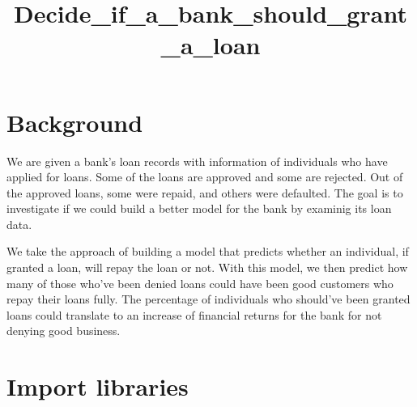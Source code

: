 \documentclass{report}
\title{Decide\_if\_a\_bank\_should\_grant\_a\_loan}
\begin{document}
    
    
    
    \maketitle
    
    
    \tableofcontents


    
\chapter{Background}\label{background}

We are given a bank's loan records with information of individuals who
have applied for loans. Some of the loans are approved and some are
rejected. Out of the approved loans, some were repaid, and others were
defaulted. The goal is to investigate if we could build a better model
for the bank by examinig its loan data.

We take the approach of building a model that predicts whether an
individual, if granted a loan, will repay the loan or not. With this
model, we then predict how many of those who've been denied loans could
have been good customers who repay their loans fully. The percentage of
individuals who should've been granted loans could translate to an
increase of financial returns for the bank for not denying good
business.

\chapter{Import libraries}\label{import-libraries}
\end{document}
